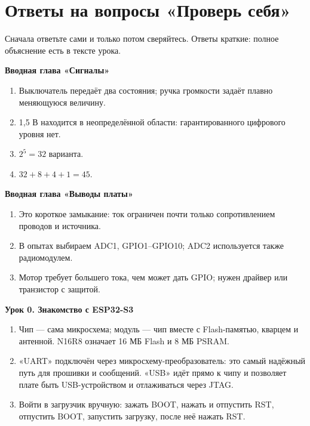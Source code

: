 \section{Ответы на вопросы «Проверь себя»}
Сначала ответьте сами и только потом сверяйтесь. Ответы краткие: полное объяснение есть в тексте урока.

\begingroup
\newcommand{\anslesson}[1]{\par\medskip\noindent\textsf{\bfseries\color{accent}#1}\par\nopagebreak}
\small

\anslesson{Вводная глава «Сигналы»}
\begin{enumerate}
\item Выключатель передаёт два состояния; ручка громкости задаёт плавно меняющуюся величину.
\item 1,5 В находится в неопределённой области: гарантированного цифрового уровня нет.
\item $2^5=32$ варианта.
\item $32+8+4+1=45$.
\end{enumerate}
\anslesson{Вводная глава «Выводы платы»}
\begin{enumerate}
\item Это короткое замыкание: ток ограничен почти только сопротивлением проводов и источника.
\item В опытах выбираем ADC1, GPIO1--GPIO10; ADC2 используется также радиомодулем.
\item Мотор требует большего тока, чем может дать GPIO; нужен драйвер или транзистор с защитой.
\end{enumerate}

\anslesson{Урок 0. Знакомство с ESP32-S3}
\begin{enumerate}
  \item Чип --- сама микросхема; модуль --- чип вместе с Flash-памятью, кварцем и антенной. N16R8 означает 16 МБ Flash и 8 МБ PSRAM.
  \item «UART» подключён через микросхему-преобразователь: это самый надёжный путь для прошивки и сообщений. «USB» идёт прямо к чипу и позволяет плате быть USB-устройством и отлаживаться через JTAG.
  \item Войти в загрузчик вручную: зажать BOOT, нажать и отпустить RST, отпустить BOOT, запустить загрузку, после неё нажать RST.
\end{enumerate}

